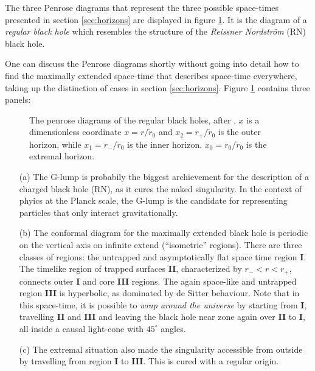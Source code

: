 \documentclass[12pt,a4paper]{report}
\numberwithin{equation}{chapter}
\begin{document}
The three Penrose diagrams that represent the three possible space-times presented in section \ref{sec:horizons} are displayed in figure \ref{fig:penrose-regular}. It is the diagram of a \emph{regular black hole} which resembles the structure of the \emph{Reissner Nordström} (RN) black hole.

One can discuss the Penrose diagrams shortly without going into detail how to find the maximally extended space-time that describes space-time everywhere, taking up the distinction of cases in section \ref{sec:horizons}.  Figure \ref{fig:penrose-regular} contains three panels:

\begin{figure}
\caption[Penrose diagram of regular black holes, made on basis of \cite{Ansoldi2008} in a color fashion like \cite{Hayward:2005gi}]{The penrose diagrams of the regular black holes, after \cite{Ansoldi2008,Hayward:2005gi,MMN2010}. $x$ is a dimensionless coordinate $x=r/\tilde r_0$ and $x_2=r_+/\tilde r_0$ is the outer horizon, while $x_1=r_-/\tilde r_0$ is the inner horizon. $x_0=r_0/\tilde r_0$ is the extremal horizon. %
}\label{fig:penrose-regular}
\end{figure}

\begin{enumerate}
\item[(a)] The G-lump is probabily the biggest archievement for the description of a charged black hole (RN), as it cures the naked singularity. In the context of phyics at the Planck scale, the G-lump is the candidate for representing particles that only interact gravitationally.
%
\item[(b)] The conformal diagram for the maximally extended black hole is periodic on the vertical axis on infinite extend (``isometric'' regions). There are three classes of regions: the untrapped and asymptotically flat space time region {\bf I}. The timelike region of trapped surfaces {\bf II}, characterized by $r_- < r < r_+$, connects outer {\bf I} and core {\bf III} regions. The again space-like and untrapped region {\bf III} is hyperbolic, as dominated by de Sitter behaviour. Note that in this space-time, it is possible to \emph{wrap around the universe} by starting from {\bf I}, travelling {\bf II} and {\bf III} and leaving the black hole near zone again over {\bf II} to {\bf I}, all inside a causal light-cone with $45^\circ$ angles.
%
\item[(c)] The extremal situation also made the singularity accessible from outside by travelling from region {\bf I} to {\bf III}. This is cured with a regular origin.
\end{enumerate}
\end{document}
